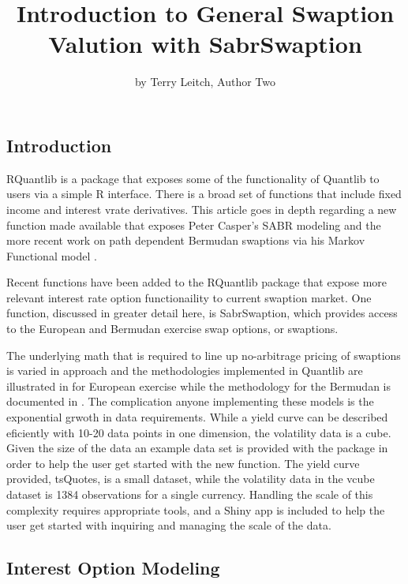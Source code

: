 \title{Introduction to General Swaption Valution with SabrSwaption}
\author{by Terry Leitch, Author Two}

\maketitle


\subsection{Introduction}\label{introduction}

RQuantlib is a package that exposes some of the functionality of
Quantlib to users via a simple R interface. There is a broad set of
functions that include fixed income and interest vrate derivatives. This
article goes in depth regarding a new function made available that
exposes Peter Casper's SABR modeling and the more recent work on path
dependent Bermudan swaptions via his Markov Functional model
\citet{caspers}.

Recent functions have been added to the RQuantlib package that expose
more relevant interest rate option functionaility to current swaption
market. One function, discussed in greater detail here, is SabrSwaption,
which provides access to the European and Bermudan exercise swap
options, or swaptions.

The underlying math that is required to line up no-arbitrage pricing of
swaptions is varied in approach and the methodologies implemented in
Quantlib are illustrated in \citet{Brigo} for European exercise while
the methodology for the Bermudan is documented in . The
complication anyone implementing these models is the exponential grwoth
in data requirements. While a yield curve can be described eficiently
with 10-20 data points in one dimension, the volatility data is a cube.
Given the size of the data an example data set is provided with the
package in order to help the user get started with the new function. The
yield curve provided, tsQuotes, is a small dataset, while the volatility
data in the vcube dataset is 1384 observations for a single currency.
Handling the scale of this complexity requires appropriate tools, and a
Shiny app is included to help the user get started with inquiring and
managing the scale of the data.

\subsection{Interest Option Modeling}\label{interest-option-modeling}

